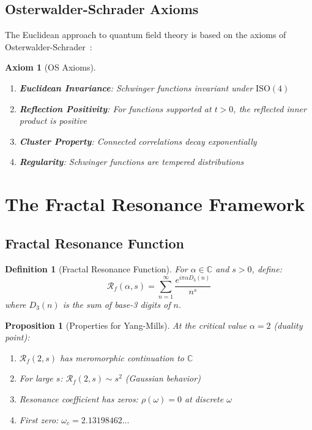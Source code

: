 \documentclass[12pt]{article}
\newcommand{\C}{\mathbb{C}}
\newcommand{\fractalres}{\mathcal{R}_f}
\newcommand{\resonancecoeff}{\rho}
\newcommand{\digitalsum}{D_3}
\newtheorem{proposition}[theorem]{Proposition}
\newtheorem{definition}[theorem]{Definition}
\newtheorem{axiom}[theorem]{Axiom}
\begin{document}
\subsection{Osterwalder-Schrader Axioms}

The Euclidean approach to quantum field theory is based on the axioms of Osterwalder-Schrader~\cite{osterwalder1973axioms,osterwalder1975axioms}:

\begin{axiom}[OS Axioms]
\begin{enumerate}
\item \textbf{Euclidean Invariance}: Schwinger functions invariant under $\mathrm{ISO}(4)$
\item \textbf{Reflection Positivity}: For functions supported at $t > 0$, the reflected inner product is positive
\item \textbf{Cluster Property}: Connected correlations decay exponentially
\item \textbf{Regularity}: Schwinger functions are tempered distributions
\end{enumerate}
\end{axiom}

\section{The Fractal Resonance Framework}

\subsection{Fractal Resonance Function}

\begin{definition}[Fractal Resonance Function]
\label{def:fractal_resonance_ym}
For $\alpha \in \C$ and $s > 0$, define:
\begin{equation}
\fractalres(\alpha, s) = \sum_{n=1}^{\infty} \frac{e^{i\pi\alpha \digitalsum(n)}}{n^s}
\end{equation}
where $\digitalsum(n)$ is the sum of base-3 digits of $n$.
\end{definition}

\begin{proposition}[Properties for Yang-Mills]
\label{prop:ym_properties}
At the critical value $\alpha = 2$ (duality point):
\begin{enumerate}
\item $\fractalres(2, s)$ has meromorphic continuation to $\C$
\item For large $s$: $\fractalres(2, s) \sim s^2$ (Gaussian behavior)
\item Resonance coefficient has zeros: $\resonancecoeff(\omega) = 0$ at discrete $\omega$
\item First zero: $\omega_c = 2.13198462...$
\end{enumerate}
\end{proposition}
\end{document}
